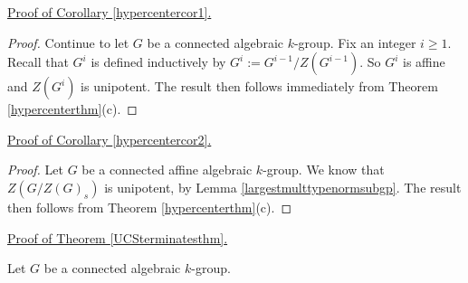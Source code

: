 \documentclass[twoside,a4paper,reqno,11pt]{amsart}
\theoremstyle{definition}
\begin{document}
\noindent \underline{Proof of Corollary \ref{hypercentercor1}.}

\begin{proof} Continue to let $G$ be a connected algebraic $k$-group. Fix an integer $i\geq 1$. Recall that $G^i$ is defined inductively by $G^i:=G^{i-1}/Z(G^{i-1})$. %
So $G^i$ is affine and $Z(G^i)$ is unipotent. %
The result then follows immediately from Theorem \ref{hypercenterthm}(c).
\end{proof}

\noindent \underline{Proof of Corollary \ref{hypercentercor2}.}

\begin{proof} Let $G$ be a connected affine algebraic $k$-group. We know that $Z(G/Z(G)_s)$ is unipotent, by Lemma \ref{largestmulttypenormsubgp}. The result then follows from Theorem \ref{hypercenterthm}(c).
\end{proof}

\noindent \underline{Proof of Theorem \ref{UCSterminatesthm}.}

\vspace{2mm}\noindent Let $G$ be a connected algebraic $k$-group.
\end{document}
